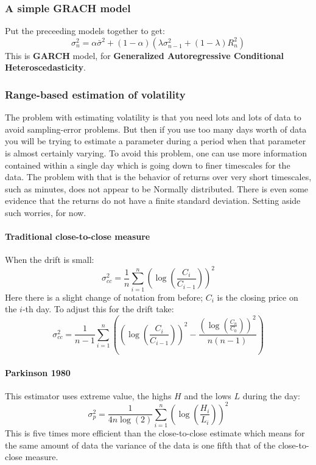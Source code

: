 \subsubsection{A simple GRACH model}
Put the preceeding models together to get:
\begin{equation}
	\sigma_n^2 = \alpha \bar{\sigma}^2 + (1 - \alpha) \left( \lambda \sigma_{n-1}^2 + (1 - \lambda) R_n^2 \right)
\end{equation}
This is \textbf{GARCH} model, for \textbf{Generalized Autoregressive Conditional Heteroscedasticity}.


\subsubsection{Range-based estimation of volatility}
The problem with estimating volatility is that you need lots and lots of data to avoid sampling-error problems. But then if you use too many days worth of data you will be trying to estimate a parameter during a period when that parameter is almost certainly varying. To avoid this problem, one can use more information contained within a single day which is going down to finer timescales for the data. The problem with that is the behavior of returns over very short timescales, such as minutes, does not appear to be Normally distributed. There is even some evidence that the returns do not have a finite standard deviation. Setting aside such worries, for now. 


\paragraph{Traditional close-to-close measure}
When the drift is small:
\begin{equation}
	\sigma_{cc}^2 = \frac{1}{n} \sum_{i=1}^n \left( \log \left( \frac{C_i}{C_{i-1}} \right) \right)^2
\end{equation}
Here there is a slight change of notation from before; $C_i$ is the closing price on the $i$-th day. To adjust this for the drift take:
\begin{equation}
	\sigma_{cc}^2 = \frac{1}{n-1} \sum_{i=1}^n \left( \left( \log \left( \frac{C_i}{C_{i-1}} \right) \right)^2 - \frac{\left( \log \left( \frac{C_n}{C_0} \right) \right)^2}{n(n-1)} \right)
\end{equation}


\paragraph{Parkinson 1980}
This estimator uses extreme value, the highs $H$ and the lows $L$ during the day:
\begin{equation}
	\sigma_{p}^2 = \frac{1}{4n \log(2)} \sum_{i=1}^n \left( \log \left( \frac{H_i}{L_i} \right) \right)^2
\end{equation}
This is five times more efficient than the close-to-close estimate which means for the same amount of data the variance of the data is one fifth that of the close-to-close measure.


